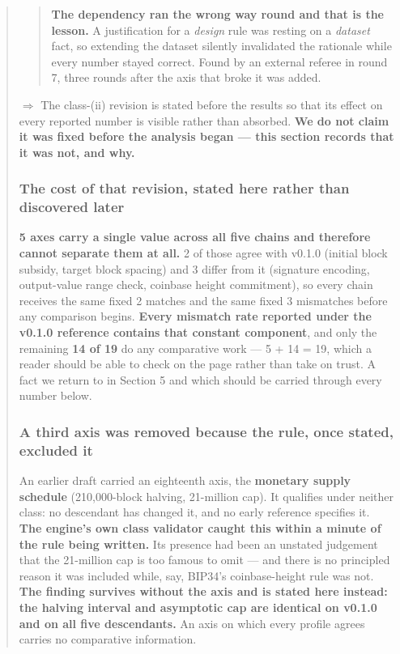 \documentclass[
]{article}
\begin{document}
\begin{quote}
\begin{quote}
\textbf{The dependency ran the wrong way round and that is the lesson.}
A justification for a \emph{design} rule was resting on a \emph{dataset}
fact, so extending the dataset silently invalidated the rationale while
every number stayed correct. Found by an external referee in round 7,
three rounds after the axis that broke it was added.
\end{quote}

\(\Rightarrow\) The class-(ii) revision is stated before the results so
that its effect on every reported number is visible rather than
absorbed. \textbf{We do not claim it was fixed before the analysis began
--- this section records that it was not, and why.}

\mbox{}%
\subsubsection{The cost of that revision, stated here rather than
discovered
later}\label{the-cost-of-that-revision-stated-here-rather-than-discovered-later}

\textbf{5 axes carry a single value across all five chains and therefore
cannot separate them at all.} 2 of those agree with v0.1.0 (initial
block subsidy, target block spacing) and 3 differ from it (signature
encoding, output-value range check, coinbase height commitment), so
every chain receives the same fixed 2 matches and the same fixed 3
mismatches before any comparison begins. \textbf{Every mismatch rate
reported under the v0.1.0 reference contains that constant component},
and only the remaining \textbf{14 of 19} do any comparative work --- 5 +
14 = 19, which a reader should be able to check on the page rather than
take on trust. A fact we return to in Section 5 and which should be
carried through every number below.

\mbox{}%
\subsubsection{A third axis was removed because the rule, once stated,
excluded
it}\label{a-third-axis-was-removed-because-the-rule-once-stated-excluded-it}

An earlier draft carried an eighteenth axis, the \textbf{monetary supply
schedule} (210,000-block halving, 21-million cap). It qualifies under
neither class: no descendant has changed it, and no early reference
specifies it. \textbf{The engine's own class validator caught this
within a minute of the rule being written.} Its presence had been an
unstated judgement that the 21-million cap is too famous to omit --- and
there is no principled reason it was included while, say, BIP34's
coinbase-height rule was not. \textbf{The finding survives without the
axis and is stated here instead: the halving interval and asymptotic cap
are identical on v0.1.0 and on all five descendants.} An axis on which
every profile agrees carries no comparative information.
\end{quote}
\end{document}
